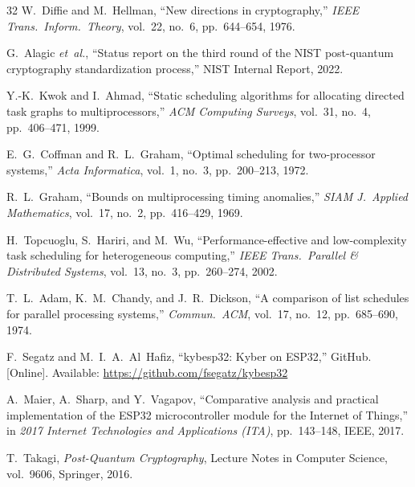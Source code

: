 \documentclass[journal]{IEEEtran}
\begin{document}
\begin{thebibliography}{32}
W.~Diffie and M.~Hellman, ``New directions in cryptography,'' \emph{IEEE Trans.\ Inform.\ Theory}, vol.~22, no.~6, pp.~644--654, 1976.

G.~Alagic \emph{et~al.}, ``Status report on the third round of the NIST post-quantum cryptography standardization process,'' NIST Internal Report, 2022.

Y.-K.~Kwok and I.~Ahmad, ``Static scheduling algorithms for allocating directed task graphs to multiprocessors,'' \emph{ACM Computing Surveys}, vol.~31, no.~4, pp.~406--471, 1999.

E.~G.~Coffman and R.~L.~Graham, ``Optimal scheduling for two-processor systems,'' \emph{Acta Informatica}, vol.~1, no.~3, pp.~200--213, 1972.

R.~L.~Graham, ``Bounds on multiprocessing timing anomalies,'' \emph{SIAM J.\ Applied Mathematics}, vol.~17, no.~2, pp.~416--429, 1969.

H.~Topcuoglu, S.~Hariri, and M.~Wu, ``Performance-effective and low-complexity task scheduling for heterogeneous computing,'' \emph{IEEE Trans.\ Parallel \& Distributed Systems}, vol.~13, no.~3, pp.~260--274, 2002.

T.~L.~Adam, K.~M.~Chandy, and J.~R.~Dickson, ``A comparison of list schedules for parallel processing systems,'' \emph{Commun.\ ACM}, vol.~17, no.~12, pp.~685--690, 1974.

F.~Segatz and M.~I.~A.~Al~Hafiz, ``kybesp32: Kyber on ESP32,'' GitHub. [Online]. Available: \url{https://github.com/fsegatz/kybesp32}

A.~Maier, A.~Sharp, and Y.~Vagapov, ``Comparative analysis and practical implementation of the ESP32 microcontroller module for the Internet of Things,'' in \emph{2017 Internet Technologies and Applications (ITA)}, pp.~143--148, IEEE, 2017.

T.~Takagi, \emph{Post-Quantum Cryptography}, Lecture Notes in Computer Science, vol.~9606, Springer, 2016.

\end{thebibliography}


\end{document}
